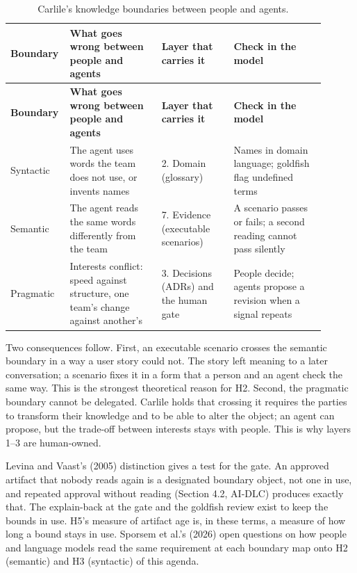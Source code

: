 \documentclass[11pt]{article}
\begin{document}
\small
\begin{longtable}{p{0.12\linewidth}p{0.28\linewidth}p{0.22\linewidth}p{0.28\linewidth}}
\caption{Carlile's knowledge boundaries between people and agents.}\label{tab:boundaries}\\
\toprule
\textbf{Boundary} & \textbf{What goes wrong between people and agents} & \textbf{Layer that carries it} & \textbf{Check in the model} \\
\midrule
\endfirsthead
\toprule
\textbf{Boundary} & \textbf{What goes wrong between people and agents} & \textbf{Layer that carries it} & \textbf{Check in the model} \\
\midrule
\endhead
Syntactic & The agent uses words the team does not use, or invents names & 2. Domain (glossary) & Names in domain language; goldfish flag undefined terms \\
Semantic & The agent reads the same words differently from the team & 7. Evidence (executable scenarios) & A scenario passes or fails; a second reading cannot pass silently \\
Pragmatic & Interests conflict: speed against structure, one team's change against another's & 3. Decisions (ADRs) and the human gate & People decide; agents propose a revision when a signal repeats \\
\bottomrule
\end{longtable}
\normalsize

Two consequences follow. First, an executable scenario crosses the semantic boundary in a way a user story could not. The story left meaning to a later conversation; a scenario fixes it in a form that a person and an agent check the same way. This is the strongest theoretical reason for H2. Second, the pragmatic boundary cannot be delegated. Carlile holds that crossing it requires the parties to transform their knowledge and to be able to alter the object; an agent can propose, but the trade-off between interests stays with people. This is why layers 1--3 are human-owned.

Levina and Vaast's (2005) distinction gives a test for the gate. An approved artifact that nobody reads again is a designated boundary object, not one in use, and repeated approval without reading (Section 4.2, AI-DLC) produces exactly that. The explain-back at the gate and the goldfish review exist to keep the bounds in use. H5's measure of artifact age is, in these terms, a measure of how long a bound stays in use. Sporsem et al.'s (2026) open questions on how people and language models read the same requirement at each boundary map onto H2 (semantic) and H3 (syntactic) of this agenda.
\end{document}
